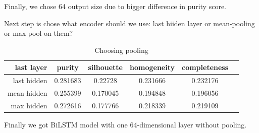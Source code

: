 \documentclass[11pt]{article}
\begin{document}
Finally, we chose 64 output size due to bigger difference in purity score.

Next step is chose what encoder should we use: last hiiden layer or mean-pooling or max pool on them?

\begin{table}[htb]
\begin{center}
\begin{tabular}{ |r|c|c|c|c|c| }
\hline
last layer & purity  & silhouette  & homogeneity  & completeness \\ \hline 
last hidden & 0.281683  & 0.22728  & 0.231666  & 0.232176\\ \hline 
mean hidden & 0.255399 &	0.170045 	& 0.194848 	& 0.196056 \\ \hline
max hidden  &	0.272616 	& 0.177766 	& 0.218339 	& 0.219109 \\ \hline
\end{tabular}
\end{center}
\caption{Choosing pooling}
\end{table}
\FloatBarrier

Finally we got BiLSTM model with one 64-dimensional layer without pooling.
\end{document}
